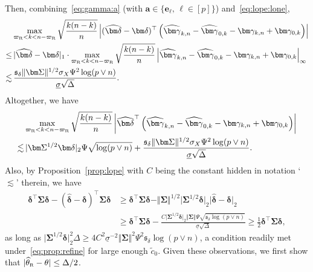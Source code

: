 \documentclass[11pt, a4paper]{article}
\newcommand{\mbf}{\mathbf}
\renewcommand{\l}{\left}
\renewcommand{\r}{\right}
\def\wh{\widehat}
\def\wt{\widetilde}
\newcommand{\cp}{\theta}
\newcommand{\nn}{\nonumber}
\newcommand{\Rf}{\text{\tiny \upshape R}} %
\theoremstyle{definition}
\theoremstyle{definition}
\theoremstyle{definition}
\theoremstyle{definition}
\theoremstyle{definition}
\theoremstyle{remark}
\theoremstyle{definition}
\theoremstyle{definition}
\theoremstyle{definition}
\begin{document}
Then, combining~\eqref{eq:gamma:a} (with $\mbf a \in \{\mbf e_\ell, \, \ell \in [p]\}$) and~\eqref{eq:lope:lone},
\begin{align}
& \max_{\varpi_{\Rf} < k < n - \varpi_{\Rf}} \sqrt{\frac{k (n - k)}{n}} \l\vert (\wh{\bm\delta} - \bm\delta)^\top \l( \wh{\bm\gamma}_{k, n} - \wh{\bm\gamma}_{0, k} - \bm\gamma_{k, n} + \bm\gamma_{0, k} \r) \r\vert 
\nn \\
\le & \, \vert \wh{\bm\delta} - \bm\delta \vert_1 \cdot \max_{\varpi_{\Rf} < k < n - \varpi_{\Rf}} \sqrt{\frac{k (n - k)}{n}} \l\vert \wh{\bm\gamma}_{k, n} - \wh{\bm\gamma}_{0, k} - \bm\gamma_{k, n} + \bm\gamma_{0, k} \r\vert_\infty 
\nn \\
\lesssim & \, \frac{\mathfrak{s}_\delta { \Vert \bm\Sigma \Vert^{1/2} \sigma_X} \Psi^2 \log(p \vee n)}{\underline{\sigma} \sqrt{\Delta}}.
\nn
\end{align}
Altogether, we have
\begin{align}
& \max_{\varpi_{\Rf} < k < n - \varpi_{\Rf}} \sqrt{\frac{k (n - k)}{n}} \l\vert \wh{\bm\delta}^\top \l( \wh{\bm\gamma}_{k, n} - \wh{\bm\gamma}_{0, k} - \bm\gamma_{k, n} + \bm\gamma_{0, k} \r) \r\vert 
\nn \\
\lesssim & \, \vert \bm\Sigma^{1/2} \bm\delta \vert_2 \Psi\sqrt{\log(p \vee n)} + \frac{\mathfrak{s}_\delta { \Vert \bm\Sigma \Vert^{1/2} \sigma_X} \Psi^2 \log(p \vee n)}{\underline{\sigma} \sqrt{\Delta}}.
\label{eq:lope:bound}
\end{align}
Also, by Proposition~\ref{prop:lope} with $C$ being the constant hidden in notation `$\lesssim$' therein, we have
\begin{align}
\bm\delta^\top \bm\Sigma \bm\delta - (\wh{\bm\delta} - \bm\delta)^\top \bm\Sigma \bm\delta 
& \ge \bm\delta^\top \bm\Sigma \bm\delta - \Vert \bm\Sigma \Vert^{1/2} \vert \bm\Sigma^{1/2} \bm\delta \vert_2 \vert \wh{\bm\delta} - \bm\delta \vert_2 
\nn \\
& \ge \bm\delta^\top \bm\Sigma \bm\delta - \frac{C\vert \bm\Sigma^{1/2} \bm\delta \vert_2 \Vert \bm\Sigma \Vert \Psi \sqrt{\mathfrak{s}_\delta \log(p \vee n)}}{\underline{\sigma} \sqrt{\Delta}}
\ge \frac{1}{2} \bm\delta^\top \bm\Sigma \bm\delta,
\label{eq:dsd}
\end{align}
as long as
$\vert \bm\Sigma^{1/2} \bm\delta \vert_2^2 \Delta \ge  4C^2 \underline{\sigma}^{-2} \Vert \bm\Sigma \Vert^2 \Psi^2 \mathfrak{s}_\delta \log(p \vee n)$, 
a condition readily met under~\eqref{eq:prop:refine} for large enough $\wt{c}_0$.
Given these observations, we first show that $\vert \wh{\cp}_{\Rf} - \cp \vert \le \Delta/2$. 
\end{document}

